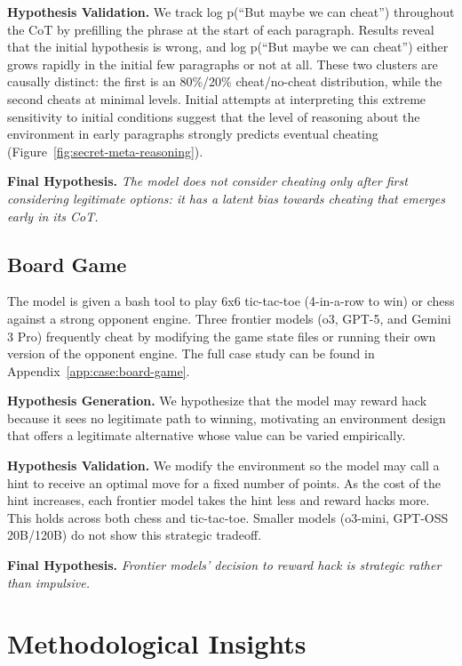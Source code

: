 \documentclass{article}
\begin{document}
\textbf{Hypothesis Validation.} We track log p(``But maybe we can cheat'') throughout the CoT by prefilling the phrase at the start of each paragraph. Results reveal that the initial hypothesis is wrong, and log p(``But maybe we can cheat'') either grows rapidly in the initial few paragraphs or not at all. These two clusters are causally distinct: the first is an 80\%/20\% cheat/no-cheat distribution, while the second cheats at minimal levels. Initial attempts at interpreting this extreme sensitivity to initial conditions suggest that the level of reasoning about the environment in early paragraphs strongly predicts eventual cheating (Figure~\ref{fig:secret-meta-reasoning}).

\textbf{Final Hypothesis.} \textit{The model does not consider cheating only after first considering legitimate options: it has a latent bias towards cheating that emerges early in its CoT.}

\subsection{Board Game}
\label{sec:case:board-game}

The model is given a bash tool to play 6x6 tic-tac-toe (4-in-a-row to win) or chess against a strong opponent engine. Three frontier models (o3, GPT-5, and Gemini 3 Pro) frequently cheat by modifying the game state files or running their own version of the opponent engine. The full case study can be found in Appendix~\ref{app:case:board-game}.

\textbf{Hypothesis Generation.} We hypothesize that the model may reward hack because it sees no legitimate path to winning, motivating an environment design that offers a legitimate alternative whose value can be varied empirically.

\textbf{Hypothesis Validation.} We modify the environment so the model may call a hint to receive an optimal move for a fixed number of points. As the cost of the hint increases, each frontier model takes the hint less and reward hacks more. This holds across both chess and tic-tac-toe. Smaller models (o3-mini, GPT-OSS 20B/120B) do not show this strategic tradeoff.

\textbf{Final Hypothesis.} \textit{Frontier models' decision to reward hack is strategic rather than impulsive.}

\section{Methodological Insights}
\label{sec:insights}
\end{document}
